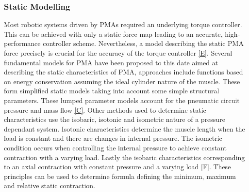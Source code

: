 \documentclass[11pt,a4paper]{article}
\begin{document}
\subsubsection{Static Modelling}
\label{sub:static_modelling}
Most robotic systems driven by PMAs required an underlying torque controller. This can be achieved with only a static force map leading to an accurate, high-performance controller scheme. Nevertheless, a model describing the static PMA force precisely is crucial for the accuracy of the torque controller \ref{E}. Several fundamental models for PMA have been proposed to this date aimed at describing the static characteristics of PMA, approaches include functions based on energy conservation assuming the ideal cylinder nature of the muscle. These form simplified static models taking into account some simple structural parameters. These lumped parameter models account for the pneumatic circuit pressure and mass flow \ref{C}. Other methods used to determine static characteristics use the isobaric, isotonic and isometric nature of a pressure dependant system. Isotonic characteristics determine the muscle length when the load is constant and there are changes in internal pressure. The isometric condition occurs when controlling the internal pressure to achieve constant contraction with a varying load. Lastly the isobaric characteristics corresponding to an axial contraction with constant pressure and a varying load \ref{F}. These principles can be used to determine formula defining the minimum, maximum and relative static contraction. \newline
\end{document}
